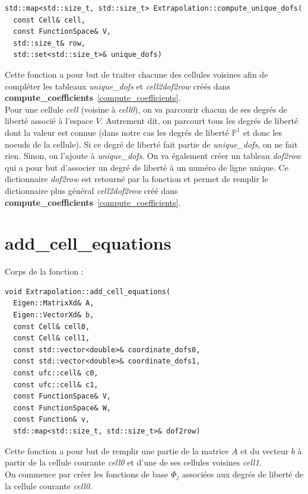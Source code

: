 \documentclass[french]{article}
\begin{document}
	\begin{lstlisting}
std::map<std::size_t, std::size_t> Extrapolation::compute_unique_dofs(
  const Cell& cell,
  const FunctionSpace& V,
  std::size_t& row,
  std::set<std::size_t>& unique_dofs)
	\end{lstlisting}
	
	Cette fonction a pour but de traiter chacune des cellules voisines afin de compléter les tableaux \textit{unique\_dofs} et \textit{cell2dof2row} créés dans \textbf{compute\_coefficients}~\ref{compute_coefficients}.\\
	
	Pour une cellule \textit{cell} (voisine à \textit{cell0}), on va parcourir chacun de ses degrés de liberté associé à l'espace $V$. Autrement dit, on parcourt tous les degrés de liberté dont la valeur est connue (dans notre cas les degrés de liberté $\mathbb{P}^1$ et donc les noeuds de la cellule). Si ce degré de liberté fait partie de \textit{unique\_dofs}, on ne fait rien. Sinon, on l'ajoute à \textit{unique\_dofs}. On va également créer un tableau \textit{dof2row} qui a pour but d'associer un degré de liberté à un numéro de ligne unique. Ce dictionnaire \textit{dof2row} est retourné par la fonction et permet de remplir le dictionnaire plus général \textit{cell2dof2row} créé dans \textbf{compute\_coefficients}~\ref{compute_coefficients}.
	
	\section{add\_cell\_equations}
	\label{add_cell_equations}
	
	Corps de la fonction :
	
	\begin{lstlisting}
void Extrapolation::add_cell_equations(
  Eigen::MatrixXd& A,
  Eigen::VectorXd& b,
  const Cell& cell0,
  const Cell& cell1,
  const std::vector<double>& coordinate_dofs0,
  const std::vector<double>& coordinate_dofs1,
  const ufc::cell& c0,
  const ufc::cell& c1,
  const FunctionSpace& V,
  const FunctionSpace& W,
  const Function& v,
  std::map<std::size_t, std::size_t>& dof2row)
	\end{lstlisting}

	Cette fonction a pour but de remplir une partie de la matrice $A$ et du vecteur $b$ à partir de la cellule courante \textit{cell0} et d'une de ses cellules voisines \textit{cell1}. \\

	On commence par créer les fonctions de base $\Phi_j$ associées aux degrés de liberté de la cellule courante \textit{cell0}.
	
\end{document}

